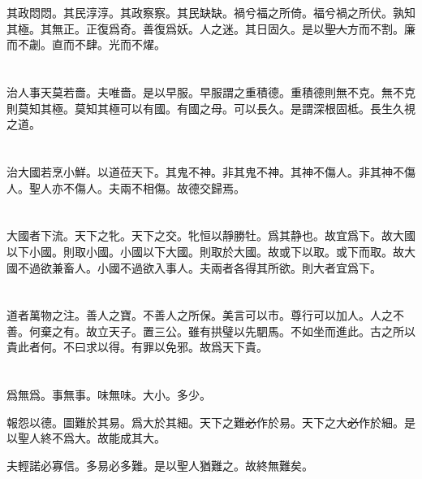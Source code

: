 \documentclass[a5paper]{ctexbook}
\newcommand{\bo}[1]{\textcolor[RGB]{0,255,255}{#1}}
\def\del{\sout}
\begin{document}
    其政悶悶。其民淳淳。其政察察。其民缺缺。禍兮福之所倚。福兮禍之所伏。孰知其極。其無正。正復爲奇。善復爲妖。人之迷。其日固久。是以\bo{\del{聖人}}方而不割。廉而不劌。直而不肆。光而不燿。

    \chapter{}

    治人事天莫若嗇。夫唯嗇。是以早服。早服謂之重積德。重積德則無不克。無不克則莫知其極。莫知其極可以有國。有國之母。可以長久。是謂深根固柢。長生久視之道。

    \chapter{}

    治大國若烹小鮮。以道莅天下。其鬼不神。非其鬼不神。其神不傷人。非其神不傷人。聖人亦不傷人。夫兩不相傷。故德交歸焉。

    \chapter{}

    大國者下流。天下之\bo{牝}。天下之\bo{交}。牝\bo{恒}以靜勝牡。\bo{爲其静也。故宜爲下}。故大國以下小國。則取小國。小國以下大國。則取\bo{於}大國。故或下以取。或下而取。\bo{故}大國不過欲兼畜人。小國不過欲入事人。夫兩者各得其所欲。\bo{則}大者宜爲下。

    \chapter{}

    道者萬物之\bo{注}。善人之寶。不善人之所保。美言可以市。尊行可以加人。人之不善。何棄之有。故立天子。置三公。雖有拱璧以先駟馬。不如\bo{坐而進此}。古之所以貴\bo{此}者何。不曰\bo{求以得}。有罪以免邪。故爲天下貴。

    \chapter{}

    爲無爲。事無事。味無味。大小。多少。

    報怨以德。圖難於其易。爲大於其細。\bo{天下之難}\bo{\del{必}}作於易。\bo{天下之大}\bo{\del{必}}作於細。是以聖人終不爲大。故能成其大。

    夫輕諾必寡信。多易必多難。是以聖人猶難之。故終無難矣。

    \chapter{}
\end{document}
